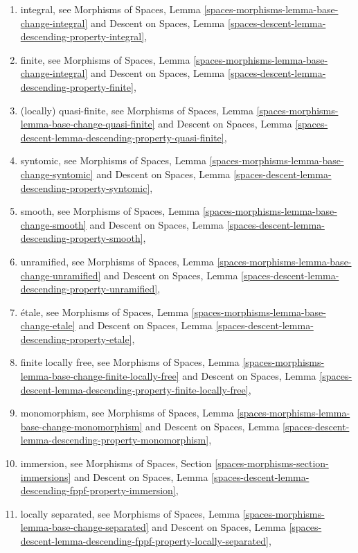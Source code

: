 \documentclass{stacks-project}
\theoremstyle{plain}
\theoremstyle{definition}
\theoremstyle{remark}
\numberwithin{equation}{subsection}
\begin{document}
\begin{enumerate}
Morphisms of Spaces,
Lemma \ref{spaces-morphisms-lemma-base-change-quasi-affine}
and
Descent on Spaces,
Lemma \ref{spaces-descent-lemma-descending-property-quasi-affine},
\item integral, see
Morphisms of Spaces,
Lemma \ref{spaces-morphisms-lemma-base-change-integral}
and
Descent on Spaces,
Lemma \ref{spaces-descent-lemma-descending-property-integral},
\item finite, see
Morphisms of Spaces,
Lemma \ref{spaces-morphisms-lemma-base-change-integral}
and
Descent on Spaces,
Lemma \ref{spaces-descent-lemma-descending-property-finite},
\item (locally) quasi-finite, see
Morphisms of Spaces,
Lemma \ref{spaces-morphisms-lemma-base-change-quasi-finite}
and
Descent on Spaces,
Lemma \ref{spaces-descent-lemma-descending-property-quasi-finite},
\item syntomic, see
Morphisms of Spaces,
Lemma \ref{spaces-morphisms-lemma-base-change-syntomic}
and
Descent on Spaces,
Lemma \ref{spaces-descent-lemma-descending-property-syntomic},
\item smooth, see
Morphisms of Spaces,
Lemma \ref{spaces-morphisms-lemma-base-change-smooth}
and
Descent on Spaces,
Lemma \ref{spaces-descent-lemma-descending-property-smooth},
\item unramified, see
Morphisms of Spaces,
Lemma \ref{spaces-morphisms-lemma-base-change-unramified}
and
Descent on Spaces,
Lemma \ref{spaces-descent-lemma-descending-property-unramified},
\item \'etale, see
Morphisms of Spaces,
Lemma \ref{spaces-morphisms-lemma-base-change-etale}
and
Descent on Spaces,
Lemma \ref{spaces-descent-lemma-descending-property-etale},
\item finite locally free, see
Morphisms of Spaces,
Lemma \ref{spaces-morphisms-lemma-base-change-finite-locally-free}
and
Descent on Spaces,
Lemma \ref{spaces-descent-lemma-descending-property-finite-locally-free},
\item monomorphism, see
Morphisms of Spaces,
Lemma \ref{spaces-morphisms-lemma-base-change-monomorphism}
and
Descent on Spaces,
Lemma \ref{spaces-descent-lemma-descending-property-monomorphism},
\item immersion, see
Morphisms of Spaces, Section \ref{spaces-morphisms-section-immersions}
and
Descent on Spaces,
Lemma \ref{spaces-descent-lemma-descending-fppf-property-immersion},
\item locally separated, see
Morphisms of Spaces,
Lemma \ref{spaces-morphisms-lemma-base-change-separated}
and
Descent on Spaces,
Lemma \ref{spaces-descent-lemma-descending-fppf-property-locally-separated},
\end{enumerate}
\end{document}
